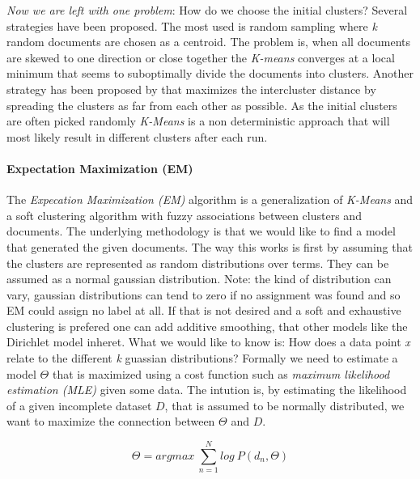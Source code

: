    \emph{Now we are left with one problem}: How do we choose the initial clusters? Several strategies have been proposed. The most used is random sampling where \emph{k} random documents are chosen as a centroid. The problem is, when all documents are skewed to one direction or close together the \emph{K-means} converges at a local minimum that seems to suboptimally divide the documents into clusters.
    Another strategy has been proposed by \cite{KMeansPlusPlus2007} that maximizes the intercluster distance by spreading the clusters as far from each other as possible. 
    As the initial clusters are often picked randomly \emph{K-Means} is a non deterministic approach that will most likely result in different clusters after each run.

    \paragraph{Expectation Maximization (EM)}
    The \emph{Expecation Maximization (EM)} algorithm is a generalization of \emph{K-Means} and a soft clustering algorithm with fuzzy associations between clusters and documents. The underlying methodology is that we would like to find a model that generated the given documents. The way this works is first by assuming that the clusters are represented as random distributions over terms. They can be assumed as a normal gaussian distribution. Note: the kind of distribution can vary, gaussian distributions can tend to zero if no assignment was found and so EM could assign no label at all. If that is not desired and a soft and exhaustive clustering is prefered one can add additive smoothing, that other models like the Dirichlet model inheret. What we would like to know is: How does a data point \emph{x} relate to the different \emph{k} guassian distributions? Formally we need to estimate a model $\Theta$ that is maximized using a cost function such as \emph{maximum likelihood estimation (MLE)} given some data. The intution is, by estimating the likelihood of a given incomplete dataset $D$, that is assumed to be normally distributed, we want to maximize the connection between $\Theta$ and $D$.

      \begin{equation}
        \Theta = argmax\:\sum_{n=1}^{N}log\:P(d_n,\Theta)
      \end{equation}

